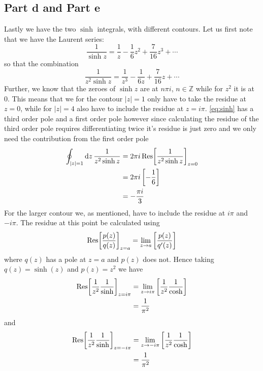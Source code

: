 \documentclass[a4paper,12pt]{article}
\begin{document}
\subsection*{Part d and Part e}
Lastly we have the two $\sinh$ integrals, with different contours. Let us first note that we have the Laurent series:
\begin{equation}
\frac{1}{\sinh z}=\frac{1}{z}-\frac{1}{6}z^2+\frac{7}{16}z^3+\cdots
\end{equation}
so that the combination
\begin{equation} \label{eq:sinh}
	\frac{1}{z^2\sinh z}=\frac{1}{z^3}-\frac{1}{6z}+\frac{7}{16}z+\cdots
\end{equation}
Further, we know that the zeroes of $\sinh z$ are at $n\pi i $, $n\in\mathds{Z}$ while for $z^2$ it is at $0$. This means that we for the contour $|z|=1$ only have to take the residue at $z=0$, while for $|z|=4$ also have to include the residue at $z=i\pi$. \eqref{eq:sinh} has a third order pole and a first order pole however since calculating the residue of the third order pole requires differentiating twice it's residue is just zero and we only need the contribution from the first order pole
\begin{equation}
\begin{aligned}
\oint_{|z|=1}\dd z\,\frac{1}{z^2\sinh z}  &=2\pi i \Res[\frac{1}{z^2\sinh z}]_{z=0}\\
&=2\pi i \left[-\frac{1}{6}\right]\\
&=-\frac{\pi i}{3}
\end{aligned}
\end{equation}
For the larger contour we, as mentioned, have to include the residue at $i\pi$ and $-i\pi$. The residue at this point be calculated using
\begin{equation}
\Res[\frac{p(z)}{q(z)}]_{z=a}=\lim_{z\to a}\left[\frac{p(z)}{q'(z)}\right]
\end{equation}
where $q(z)$ has a pole at $z=a$ and $p(z)$ does not. Hence taking $q(z)=\sinh(z)$ and $p(z)=z^2$  we have
\begin{equation}
\begin{aligned}
\Res[\frac{1}{z^2}\frac{1}{\sinh}]_{z=i \pi}&=\lim_{z\to i\pi }\left[\frac{1}{z^2}\frac{1}{\cosh}\right]\\
&=\frac{1}{\pi^2}
\end{aligned}
\end{equation}
and
\begin{equation}
	\begin{aligned}
		\Res[\frac{1}{z^2}\frac{1}{\sinh}]_{z=-i \pi}&=\lim_{z\to -i\pi }\left[\frac{1}{z^2}\frac{1}{\cosh}\right]\\
		&=\frac{1}{\pi^2}
	\end{aligned}
\end{equation}
\end{document}

